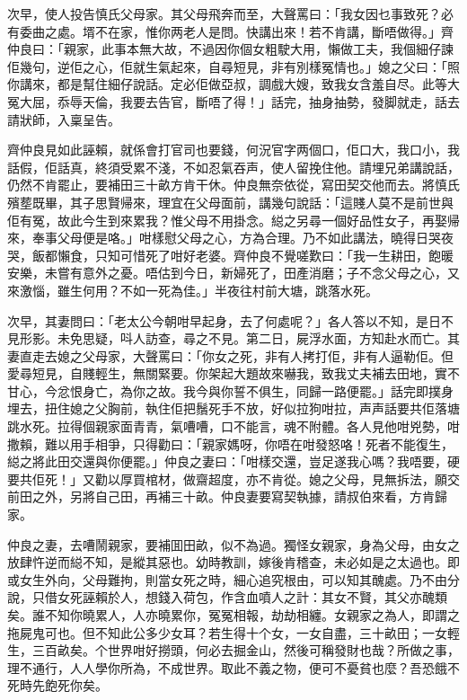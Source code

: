 \documentclass[a5paper, 12pt, openany]{book} %
\begin{document}
	次早，使人投告慎氏父母家。其父母飛奔而至，大聲罵曰：「我女因乜事致死？必有委曲之處。壻不在家，惟你两老人是問。快講出來！若不肯講，斷唔做得。」齊仲良曰：「親家，此事本無大故，不過因你個女粗駛大用，懶做工夫，我個細仔諫佢幾句，逆佢之心，佢就生氣起來，自尋短見，非有別樣冤情也。」媳之父曰：「照你講來，都是幫住細仔說話。定必佢做亞叔，調戲大嫂，致我女含羞自尽。此等大冤大屈，忝辱天倫，我要去告官，斷唔了得！」話完，抽身抽勢，發脚就走，話去請狀師，入稟呈告。

	齊仲良見如此誣賴，就係會打官司也要錢，何況官字两個口，佢口大，我口小，我話假，佢話真，終須受累不淺，不如忍氣吞声，使人留挽住他。請埋兄弟講說話，仍然不肯罷止，要補田三十畝方肯干休。仲良無奈依從，寫田契交他而去。將慎氏殯塟既畢，其子思賢帰來，理宜在父母面前，講幾句說話：「這賤人莫不是前世與佢有冤，故此今生到來累我？惟父母不用掛念。縂之另尋一個好品性女子，再娶帰來，奉事父母便是咯。」咁樣慰父母之心，方為合理。乃不如此講法，曉得日哭夜哭，飯都懶食，只知可惜死了咁好老婆。齊仲良不覺嗟歎曰：「我一生耕田，飽暖安樂，未嘗有意外之憂。唔估到今日，新婦死了，田產消磨；子不念父母之心，又來激惱，雖生何用？不如一死為佳。」半夜往村前大塘，跳落水死。

	次早，其妻問曰：「老太公今朝咁早起身，去了何處呢？」各人答以不知，是日不見形影。未免思疑，呌人訪查，尋之不見。第二日，屍浮水面，方知赴水而亡。其妻直走去媳之父母家，大聲罵曰：「你女之死，非有人拷打佢，非有人逼勒佢。但愛尋短見，自賤輕生，無關緊要。你架起大題故來嚇我，致我丈夫補去田地，實不甘心，今忿恨身亡，為你之故。我今與你誓不俱生，同歸一路便罷。」話完即撲身埋去，扭住媳之父胸前，執住佢把鬚死手不放，好似拉狗咁拉，声声話要共佢落塘跳水死。拉得個親家面青青，氣嘈嘈，口不能言，魂不附體。各人見他咁兇勢，咁撒賴，難以用手相爭，只得勸曰：「親家媽呀，你唔在咁發怒咯！死者不能復生，縂之將此田交還與你便罷。」仲良之妻曰：「咁樣交還，豈足遂我心嗎？我唔要，硬要共佢死！」又勸以厚買棺材，做齋超度，亦不肯從。媳之父母，見無拆法，願交前田之外，另將自己田，再補三十畝。仲良妻要寫契執據，請叔伯來看，方肯歸家。

	仲良之妻，去嘈鬧親家，要補囬田畝，似不為過。獨怪女親家，身為父母，由女之放肆忤逆而縂不知，是縱其惡也。幼時教訓，嫁後肯稽查，未必如是之太過也。即或女生外向，父母難拘，則當女死之時，細心追究根由，可以知其醜處。乃不由分說，只借女死誣賴於人，想錢入荷包，作含血噴人之計：其女不賢，其父亦醜類矣。誰不知你曉累人，人亦曉累你，冤冤相報，劫劫相纏。女親家之為人，即謂之拖屍鬼可也。但不知此公多少女耳？若生得十个女，一女自盡，三十畝田；一女輕生，三百畝矣。个世界咁好撈頭，何必去掘金山，然後可稱發財也哉？所做之事，理不通行，人人學你所為，不成世界。取此不義之物，便可不憂貧也麼？吾恐餓不死時先飽死你矣。
\end{document}
